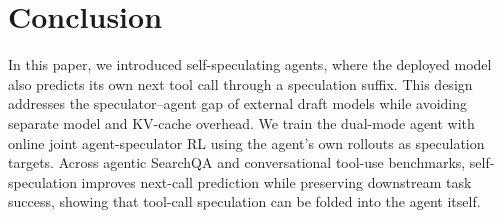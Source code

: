 \section{Conclusion}

In this paper, we introduced self-speculating agents, where the deployed model
also predicts its own next tool call through a speculation suffix. This design
addresses the speculator--agent gap of external draft models while avoiding
separate model and KV-cache overhead. We train the dual-mode agent with online
joint agent-speculator RL using the agent's own rollouts as speculation targets.
Across agentic SearchQA and conversational tool-use benchmarks, self-speculation
improves next-call prediction while preserving downstream task success, showing
that tool-call speculation can be folded into the agent itself.
